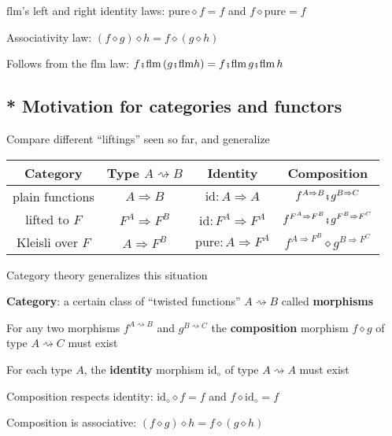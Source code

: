 $\text{flm}$'s left and right identity laws: $\text{pure}\diamond f=f$
and $f\diamond\text{pure}=f$

Associativity law: $\left(f\diamond g\right)\diamond h=f\diamond\left(g\diamond h\right)$

Follows from the $\text{flm}$ law: $f\bef\text{flm}\left(g\bef\text{flm}h\right)=f\bef\text{flm}\,g\bef\text{flm}\,h$


\subsection{{*} Motivation for categories and functors}

Compare different ``liftings'' seen so far, and generalize
\begin{center}
\vspace{-0.25cm}%
\begin{tabular}{|c|c|c|c|}
\hline 
\textbf{Category} & \textbf{Type }$A\rightsquigarrow B$ & \textbf{Identity} & \textbf{Composition}\tabularnewline
\hline 
\hline 
plain functions & $A\Rightarrow B$ & $\text{id}:A\Rightarrow A$ & $f^{A\Rightarrow B}\bef g^{B\Rightarrow C}$\tabularnewline
\hline 
lifted to $F$ & $F^{A}\Rightarrow F^{B}$ & $\text{id}:F^{A}\Rightarrow F^{A}$ & $f^{F^{A}\Rightarrow F^{B}}\bef g^{F^{B}\Rightarrow F^{C}}$\tabularnewline
\hline 
Kleisli over $F$ & $A\Rightarrow F^{B}$ & $\text{pure}:A\Rightarrow F^{A}$ & $f^{A\Rightarrow F^{B}}\diamond g^{B\Rightarrow F^{C}}$\tabularnewline
\hline 
\end{tabular}
\par\end{center}

\vspace{-0.15cm}Category theory generalizes this situation

\textbf{Category}: a certain class of ``twisted functions'' $A\rightsquigarrow B$
called \textbf{morphisms}

For any two morphisms $f^{A\rightsquigarrow B}$ and $g^{B\rightsquigarrow C}$
the \textbf{composition} morphism $f\diamond g$ of type $A\rightsquigarrow C$
must exist

For each type $A$, the \textbf{identity} morphism $\text{id}_{\diamond}$
of type $A\rightsquigarrow A$ must exist

Composition respects identity: $\text{id}_{\diamond}\diamond f=f$
and $f\diamond\text{id}_{\diamond}=f$

Composition is associative: $\left(f\diamond g\right)\diamond h=f\diamond\left(g\diamond h\right)$

